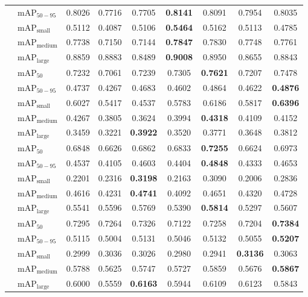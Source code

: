 \documentclass[runningheads]{llncs}
\begin{document}
\begin{table}
\begin{tabular}{>{\centering\arraybackslash}p{1.8cm}lccccccc}
 & mAP$_{50-95}$ & 0.8026 & 0.7716 & 0.7705 & \textbf{0.8141}& 0.8091 & 0.7954 & 0.8035 
\\
 & mAP$_{\text{small}}$ & 0.5112 & 0.4087 & 0.5106 & \textbf{0.5464}& 0.5162 & 0.5113 & 0.4785 
\\
 & mAP$_{\text{medium}}$ & 0.7738 & 0.7150 & 0.7144 & \textbf{0.7847}& 0.7830 & 0.7748 & 0.7761 
\\
 & mAP$_{\text{large}}$ & 0.8859 & 0.8883 & 0.8489 & \textbf{0.9008}& 0.8950 & 0.8655 & 0.8843 
\\
\hline
\multirow{5}{*}{Industrial}
 & mAP$_{50}$ & 0.7232 & 0.7061 & 0.7239 & 0.7305 & \textbf{0.7621}& 0.7207 & 0.7478 
\\
 & mAP$_{50-95}$ & 0.4737 & 0.4267 & 0.4683 & 0.4602 & 0.4864 & 0.4622 & \textbf{0.4876}\\
 & mAP$_{\text{small}}$ & 0.6027 & 0.5417 & 0.4537 & 0.5783 & 0.6186 & 0.5817 & \textbf{0.6396}\\
 & mAP$_{\text{medium}}$ & 0.4267 & 0.3805 & 0.3624 & 0.3994 & \textbf{0.4318}& 0.4109 & 0.4152 
\\
 & mAP$_{\text{large}}$ & 0.3459 & 0.3221 & \textbf{0.3922}& 0.3520 & 0.3771 & 0.3648 & 0.3812 
\\
\hline
\multirow{5}{*}{Medical}
 & mAP$_{50}$ & 0.6848 & 0.6626 & 0.6862 & 0.6833 & \textbf{0.7255}& 0.6624 & 0.6973 
\\
 & mAP$_{50-95}$ & 0.4537 & 0.4105 & 0.4603 & 0.4404 & \textbf{0.4848}& 0.4333 & 0.4653 
\\
 & mAP$_{\text{small}}$ & 0.2201 & 0.2316 & \textbf{0.3198}& 0.2163 & 0.3090 & 0.2006 & 0.2836 
\\
 & mAP$_{\text{medium}}$ & 0.4616 & 0.4231 & \textbf{0.4741}& 0.4092 & 0.4651 & 0.4320 & 0.4728 
\\
 & mAP$_{\text{large}}$ & 0.5541 & 0.5596 & 0.5769 & 0.5390 & \textbf{0.5814}& 0.5297 & 0.5607 
\\
\hline
\multirow{5}{*}{Microscopic}
 & mAP$_{50}$ & 0.7295 & 0.7264 & 0.7326 & 0.7122 & 0.7258 & 0.7204 & \textbf{0.7384}\\
 & mAP$_{50-95}$ & 0.5115 & 0.5004 & 0.5131 & 0.5046 & 0.5132 & 0.5055 & \textbf{0.5207}\\
 & mAP$_{\text{small}}$ & 0.2999 & 0.3036 & 0.3026 & 0.2980 & 0.2941 & \textbf{0.3136}& 0.3063 
\\
 & mAP$_{\text{medium}}$ & 0.5788 & 0.5625 & 0.5747 & 0.5727 & 0.5859 & 0.5676 & \textbf{0.5867}\\
 & mAP$_{\text{large}}$ & 0.6000 & 0.5559 & \textbf{0.6163}& 0.5944 & 0.6109 & 0.6123 & 0.5843 

\end{tabular}
\end{table}
\end{document}
